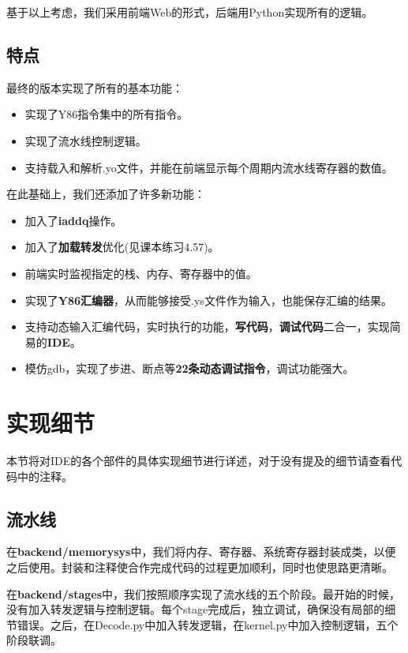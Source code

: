 \documentclass[12pt]{article} %
\begin{document}
\begin{sloppypar}
基于以上考虑，我们采用前端Web的形式，后端用Python实现所有的逻辑。

\subsection{特点}

最终的版本实现了所有的基本功能：
\begin{itemize}
\item 实现了Y86指令集中的所有指令。
\item 实现了流水线控制逻辑。
\item 支持载入和解析.yo文件，并能在前端显示每个周期内流水线寄存器的数值。
\end{itemize}

在此基础上，我们还添加了许多新功能：
\begin{itemize}
\item 加入了{\bf iaddq}操作。
\item 加入了{\bf 加载转发}优化(见课本练习4.57)。
\item 前端实时监视指定的栈、内存、寄存器中的值。
\item 实现了{\bf Y86汇编器}，从而能够接受.ys文件作为输入，也能保存汇编的结果。
\item 支持动态输入汇编代码，实时执行的功能，{\bf 写代码}，{\bf 调试代码}二合一，实现简易的{\bf IDE}。
\item 模仿gdb，实现了步进、断点等{\bf 22条动态调试指令}，调试功能强大。
\end{itemize}

\clearpage
\section{实现细节}

本节将对IDE的各个部件的具体实现细节进行详述，对于没有提及的细节请查看代码中的注释。

\subsection{流水线}

在{\bf backend/memory\underline{\hspace{0.5em}}sys}中，我们将内存、寄存器、系统寄存器封装成类，以便之后使用。封装和注释使合作完成代码的过程更加顺利，同时也使思路更清晰。

在{\bf backend/stages}中，我们按照顺序实现了流水线的五个阶段。最开始的时候，没有加入转发逻辑与控制逻辑。每个stage完成后，独立调试，确保没有局部的细节错误。之后，在Decode.py中加入转发逻辑，在kernel.py中加入控制逻辑，五个阶段联调。


\end{sloppypar}
\end{document}
